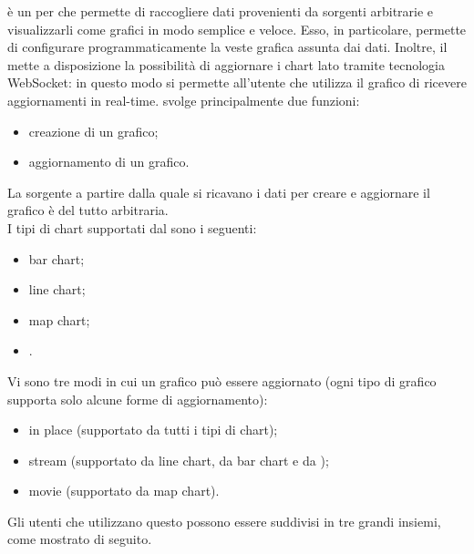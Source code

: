 		 è un  per  che permette di raccogliere dati provenienti da sorgenti arbitrarie e visualizzarli come grafici in modo semplice e veloce. Esso, in particolare, permette di configurare programmaticamente la veste grafica assunta dai dati. Inoltre, il  mette a disposizione la possibilità di aggiornare i chart lato  tramite tecnologia WebSocket: in questo modo si permette all'utente che utilizza il grafico di ricevere aggiornamenti in real-time.
		 svolge principalmente due funzioni:
		\begin{itemize}
			\item creazione di un grafico;
			\item aggiornamento di un grafico.
		\end{itemize}
		La sorgente a partire dalla quale si ricavano i dati per creare e aggiornare il grafico è del tutto arbitraria.\\
		I tipi di chart supportati dal  sono i seguenti:
		\begin{itemize}
			\item bar chart;
			\item line chart;
			\item map chart;
			\item {}.
		\end{itemize}
		Vi sono tre modi in cui un grafico può essere aggiornato (ogni tipo di grafico supporta solo alcune forme di aggiornamento):
		\begin{itemize}
			\item in place (supportato da tutti i tipi di chart);
			\item stream (supportato da line chart, da bar chart e da );
			\item movie (supportato da map chart).
		\end{itemize}
		Gli utenti che utilizzano questo  possono essere suddivisi in tre grandi insiemi, come mostrato di seguito.
